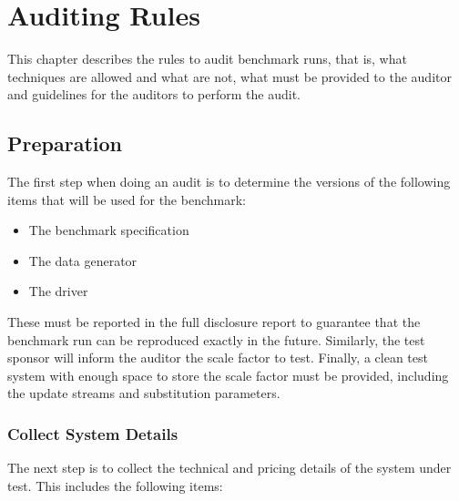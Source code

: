 \chapter{Auditing Rules}
\label{section:auditing-rules}

This chapter describes the rules to audit benchmark runs, that is, what
techniques are allowed and what are not, what must be provided to the auditor
and guidelines for the auditors to perform the audit.


\section{Preparation}

The first step when doing an audit is to determine the versions of the
following items that will be used for the benchmark:

\begin{itemize}
  \item The benchmark specification
  \item The data generator
  \item The driver
\end{itemize}

These must be reported in the full disclosure report to guarantee that the
benchmark run can be reproduced exactly in the future. Similarly, the test
sponsor will inform the auditor the scale factor to test. Finally, a clean test
system with enough space to store the scale factor must be provided, including
the update streams and substitution parameters.


\subsection{Collect System Details}

The next step is to collect the technical and pricing details of the system
under test. This includes the following items:

